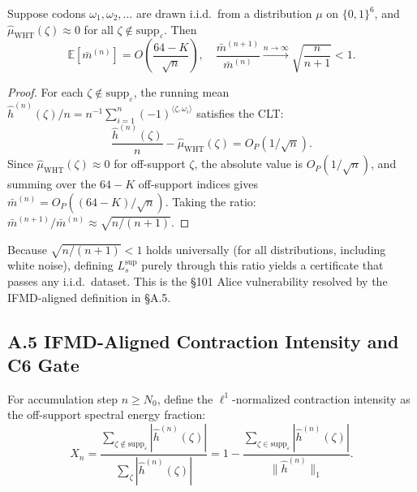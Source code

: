 \documentclass[11pt]{article}
\begin{document}
\begin{proposition}\label{prop:clt}
Suppose codons $\omega_1, \omega_2, \ldots$ are drawn i.i.d.\ from a
distribution $\mu$ on $\{0,1\}^6$, and $\hat{\mu}_{\mathrm{WHT}}(\zeta) \approx 0$
for all $\zeta \notin \mathrm{supp}_\varepsilon$.  Then
\[
  \mathbb{E}[\bar{m}^{(n)}]
  = O\!\left(\frac{64 - K}{\sqrt{n}}\right),
  \quad
  \frac{\bar{m}^{(n+1)}}{\bar{m}^{(n)}}
  \xrightarrow{n\to\infty} \sqrt{\frac{n}{n+1}} < 1.
\]
\end{proposition}

\begin{proof}
For each $\zeta \notin \mathrm{supp}_\varepsilon$, the running mean
$\hat{h}^{(n)}(\zeta)/n = n^{-1}\sum_{i=1}^n (-1)^{\langle\zeta,\omega_i\rangle}$
satisfies the CLT:
\[
  \frac{\hat{h}^{(n)}(\zeta)}{n} - \hat{\mu}_{\mathrm{WHT}}(\zeta)
  = O_P(1/\sqrt{n}).
\]
Since $\hat{\mu}_{\mathrm{WHT}}(\zeta) \approx 0$ for off-support $\zeta$,
the absolute value is $O_P(1/\sqrt{n})$, and summing over the $64-K$
off-support indices gives
$\bar{m}^{(n)} = O_P((64-K)/\sqrt{n})$.
Taking the ratio:
$\bar{m}^{(n+1)}/\bar{m}^{(n)} \approx \sqrt{n/(n+1)}$.
\end{proof}

\begin{remark}
Because $\sqrt{n/(n+1)} < 1$ holds universally (for all distributions,
including white noise), defining $L_s^{\sup}$ purely through this ratio
yields a certificate that passes any i.i.d.\ dataset.  This is the §101
Alice vulnerability resolved by the IFMD-aligned definition in \S A.5.
\end{remark}

\subsection*{A.5 \quad IFMD-Aligned Contraction Intensity and C6 Gate}

\begin{definition}\label{def:Xn}
For accumulation step $n \ge N_0$, define the $\ell^1$-normalized
contraction intensity as the off-support spectral energy fraction:
\[
  X_n = \frac{\displaystyle\sum_{\zeta \notin \mathrm{supp}_\varepsilon}
                |\hat{h}^{(n)}(\zeta)|}
             {\displaystyle\sum_{\zeta} |\hat{h}^{(n)}(\zeta)|}
  = 1 - \frac{\sum_{\zeta \in \mathrm{supp}_\varepsilon}
                |\hat{h}^{(n)}(\zeta)|}{\|\hat{h}^{(n)}\|_1}.
\]
\end{definition}
\end{document}
